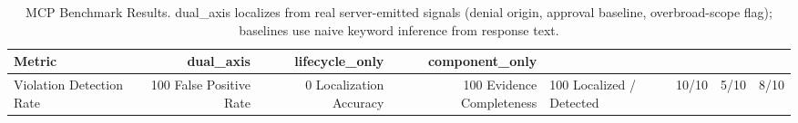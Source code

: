 \begin{table}[h]
\centering
\begin{tabular}{lrrr}
\hline
Metric & dual\_axis & lifecycle\_only & component\_only \\
\hline
Violation Detection Rate & 100%
False Positive Rate & 0%
Localization Accuracy & 100%
Evidence Completeness & 100%
Localized / Detected & 10/10 & 5/10 & 8/10 \\
\hline
\end{tabular}
\caption{MCP Benchmark Results. dual\_axis localizes from real server-emitted signals (denial origin, approval baseline, overbroad-scope flag); baselines use naive keyword inference from response text.}
\label{tab:benchmark}
\end{table}